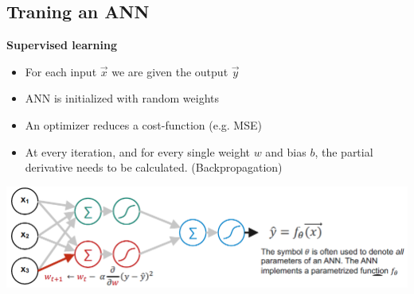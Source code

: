 \subsection{Traning an ANN}
\textbf{Supervised learning}
\begin{itemize}
    \item For each input $\vec{x}$ we are given the output $\vec{y}$
    \item ANN is initialized with random weights
    \item An optimizer reduces a cost-function (e.g. MSE)
    \item At every iteration, and for every single weight $w$ and bias $b$, the partial derivative needs to be calculated. (Backpropagation)
\end{itemize}
\includegraphics[width=\linewidth]{./img/train_ann.png}
